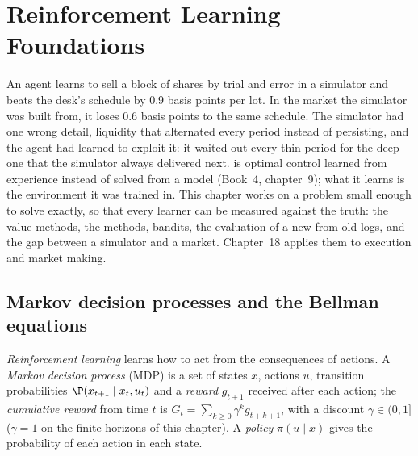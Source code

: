 \chapter{Reinforcement Learning Foundations}\label{ch:ml:reinforcement-learning-foundations}

An agent learns to sell a block of shares by trial and error in a simulator and beats the desk's schedule by 0.9 basis
points per lot. In the market the simulator was built from, it loses 0.6 basis points to the same schedule. The simulator
had one wrong detail, liquidity that alternated every period instead of persisting, and the agent had learned to exploit
it: it waited out every thin period for the deep one that the simulator always delivered next.  is
optimal control learned from experience instead of solved from a model (Book~4, chapter~9); what it learns is the
environment it was trained in. This chapter works on a problem small enough to solve exactly, so that every learner can be
measured against the truth: the value methods, the  methods, bandits, the evaluation of a new  from old logs,
and the gap between a simulator and a market. Chapter~18 applies them to execution and market making.

\section{Markov decision processes and the Bellman equations}

\begin{definition}\label{def:ml:reinforcement-learning-foundations:mdp}
\emph{Reinforcement learning} learns how to act from the consequences of actions. A
\emph{Markov decision process} (MDP) is a set of states $x$, actions $u$, transition
probabilities $\P(x_{t+1}\mid x_t, u_t)$ and a \emph{reward} $g_{t+1}$ received after each action; the
\emph{cumulative reward} from time $t$ is $G_t = \sum_{k\ge0}\gamma^kg_{t+k+1}$, with a discount
$\gamma\in(0,1]$ ($\gamma = 1$ on the finite horizons of this chapter). A \emph{policy} $\pi(u\mid x)$ gives the
probability of each action in each state.
\end{definition}

